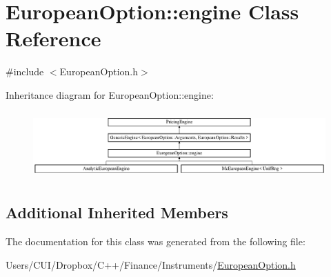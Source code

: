 \hypertarget{class_european_option_1_1engine}{}\section{European\+Option\+:\+:engine Class Reference}
\label{class_european_option_1_1engine}


{\ttfamily \#include $<$European\+Option.\+h$>$}

Inheritance diagram for European\+Option\+:\+:engine\+:\begin{figure}[H]
\begin{center}
\leavevmode
\includegraphics[height=2.586605cm]{class_european_option_1_1engine}
\end{center}
\end{figure}
\subsection*{Additional Inherited Members}


The documentation for this class was generated from the following file\+:\begin{DoxyCompactItemize}
\item 
Users/\+C\+U\+I/\+Dropbox/\+C++/\+Finance/\+Instruments/\hyperlink{_european_option_8h}{European\+Option.\+h}\end{DoxyCompactItemize}
